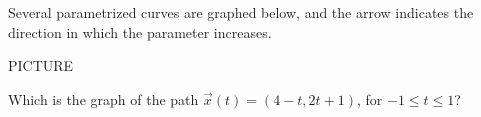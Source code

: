 \begin{problem}
Several parametrized curves are graphed below, and the arrow indicates the direction in which the parameter increases.

PICTURE

Which is the graph of the path $\vec{x}(t) = (4-t, 2t+1)$, for $-1\leq t\leq 1$?
\begin{multipleChoice}
\end{multipleChoice}
\end{problem}